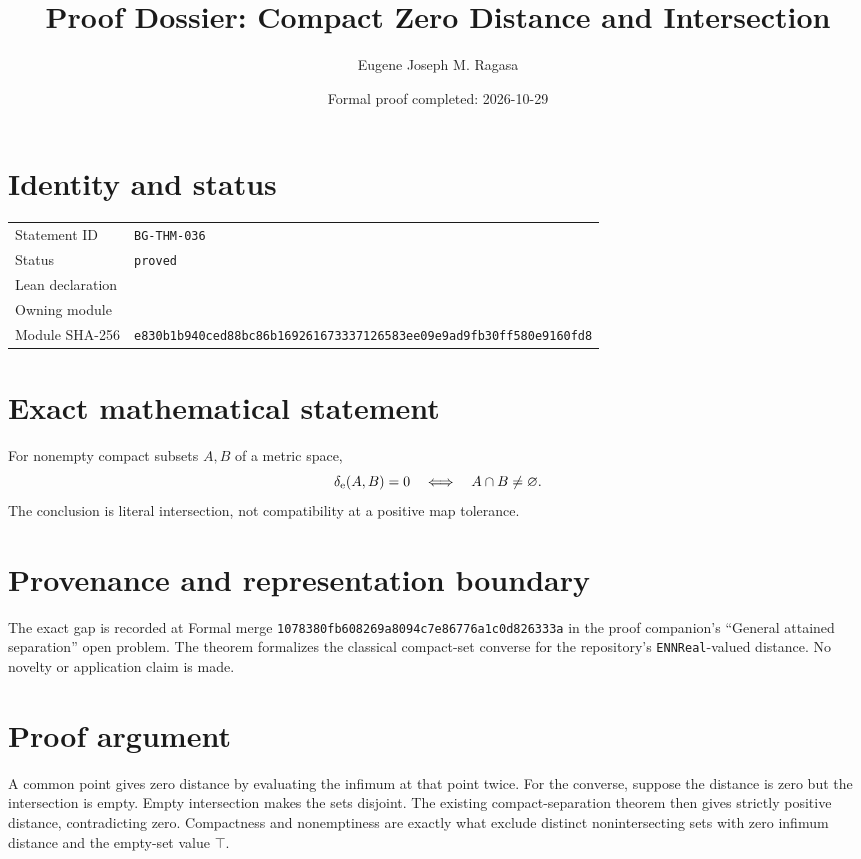 \documentclass[11pt]{article}
\title{Proof Dossier: Compact Zero Distance and Intersection}
\author{Eugene Joseph M. Ragasa}
\date{Formal proof completed: 2026-10-29}
\begin{document}
\maketitle
\section{Identity and status}
\begin{tabularx}{\textwidth}{@{}lY@{}}\toprule
Statement ID & \texttt{BG-THM-036} \\
Status & \texttt{proved} \\
Lean declaration &  \\
Owning module &  \\
Module SHA-256 & \texttt{e830b1b940ced88bc86b169261673337126583ee09e9ad9fb30ff580e9160fd8} \\
\bottomrule\end{tabularx}
\section{Exact mathematical statement}
For nonempty compact subsets $A,B$ of a metric space,
\[
  \delta_{\rm e}(A,B)=0 \quad\Longleftrightarrow\quad A\cap B\ne\varnothing.
\]
The conclusion is literal intersection, not compatibility at a positive map tolerance.
\section{Provenance and representation boundary}
The exact gap is recorded at Formal merge
\texttt{1078380fb608269a8094c7e86776a1c0d826333a} in the proof companion's
``General attained separation'' open problem. The theorem formalizes the classical
compact-set converse for the repository's \texttt{ENNReal}-valued distance. No novelty
or application claim is made.
\section{Proof argument}
A common point gives zero distance by evaluating the infimum at that point twice. For
the converse, suppose the distance is zero but the intersection is empty. Empty
intersection makes the sets disjoint. The existing compact-separation theorem then gives
strictly positive distance, contradicting zero. Compactness and nonemptiness are exactly
what exclude distinct nonintersecting sets with zero infimum distance and the empty-set
value $\top$.
\end{document}
